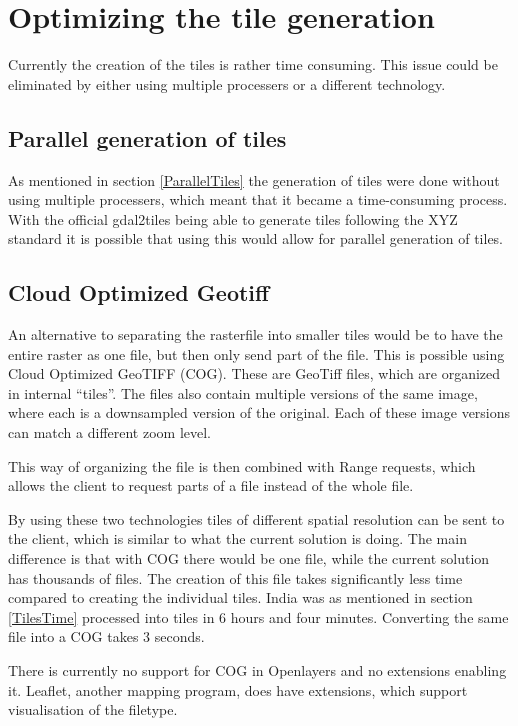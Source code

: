 \section{Optimizing the tile generation}

Currently the creation of the tiles is rather time consuming. This issue could be eliminated by either using multiple processers or a different technology.

\subsection{Parallel generation of tiles}
As mentioned in section \ref{ParallelTiles} the generation of tiles were done without using multiple processers, which meant that it became a time-consuming process. With the official gdal2tiles being able to generate tiles following the XYZ standard it is possible that using this would allow for parallel generation of tiles. 


\subsection{Cloud Optimized Geotiff}

An alternative to separating the rasterfile into smaller tiles would be to have the entire raster as one file, but then only send part of the file. This is possible using Cloud Optimized GeoTIFF (COG). These are GeoTiff files, which are organized in internal “tiles”.
The files also contain multiple versions of the same image, where each is a downsampled version of the original. Each of these image versions can match a different zoom level.


This way of organizing the file is then combined with Range requests, which allows the client to request parts of a file instead of the whole file. \citep{COGoverview} 

By using these two technologies tiles of different spatial resolution can be sent to the client, which is similar to what the current solution is doing. The main difference is that with COG there would be one file, while the current solution has thousands of files. The creation of this file takes significantly less time compared to creating the individual tiles. India was as mentioned in section \ref{TilesTime} processed into tiles in 6 hours and four minutes. Converting the same file into a COG takes 3 seconds.



There is currently no support for COG in Openlayers and no extensions enabling it. Leaflet, another mapping program, does have extensions, which support visualisation of the filetype.
\citep{COGopenlayers}

 

